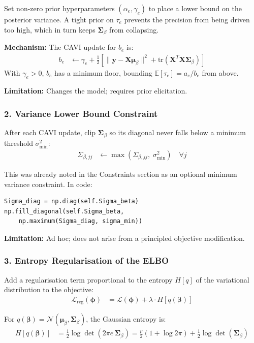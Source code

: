 \documentclass[11pt,a4paper]{article}
\begin{document}
Set non-zero prior hyperparameters $(\alpha_e, \gamma_e)$ to place a lower bound on the posterior variance. A tight prior on $\tau_e$ prevents the precision from being driven too high, which in turn keeps $\bm{\Sigma}_\beta$ from collapsing.

\textbf{Mechanism:} The CAVI update for $b_e$ is:
\begin{align}
  b_e &\leftarrow \gamma_e + \frac{1}{2}\left[\|\bm{y} - \bm{X}\bm{\mu}_\beta\|^2 + \mathrm{tr}(\bm{X}^T\bm{X}\bm{\Sigma}_\beta)\right]
\end{align}
With $\gamma_e > 0$, $b_e$ has a minimum floor, bounding $\mathbb{E}[\tau_e] = a_e/b_e$ from above.

\textbf{Limitation:} Changes the model; requires prior elicitation.

\subsubsection*{2. Variance Lower Bound Constraint}

After each CAVI update, clip $\bm{\Sigma}_\beta$ so its diagonal never falls below a minimum threshold $\sigma^2_{\min}$:
\begin{align}
  \Sigma_{\beta,jj} &\leftarrow \max\!\left(\Sigma_{\beta,jj},\; \sigma^2_{\min}\right) \quad \forall j
\end{align}

This was already noted in the Constraints section as an optional minimum variance constraint. In code:
\begin{verbatim}
Sigma_diag = np.diag(self.Sigma_beta)
np.fill_diagonal(self.Sigma_beta,
    np.maximum(Sigma_diag, sigma_min))
\end{verbatim}

\textbf{Limitation:} Ad hoc; does not arise from a principled objective modification.

\subsubsection*{3. Entropy Regularisation of the ELBO}

Add a regularisation term proportional to the entropy $H[q]$ of the variational distribution to the objective:
\begin{align}
  \mathcal{L}_{\text{reg}}(\bm{\phi}) &= \mathcal{L}(\bm{\phi}) + \lambda \cdot H[q(\bm{\beta})]
\end{align}

For $q(\bm{\beta}) = \mathcal{N}(\bm{\mu}_\beta, \bm{\Sigma}_\beta)$, the Gaussian entropy is:
\begin{align}
  H[q(\bm{\beta})] &= \frac{1}{2} \log \det(2\pi e\, \bm{\Sigma}_\beta)
               = \frac{p}{2}(1 + \log 2\pi) + \frac{1}{2}\log\det(\bm{\Sigma}_\beta)
\end{align}
\end{document}
